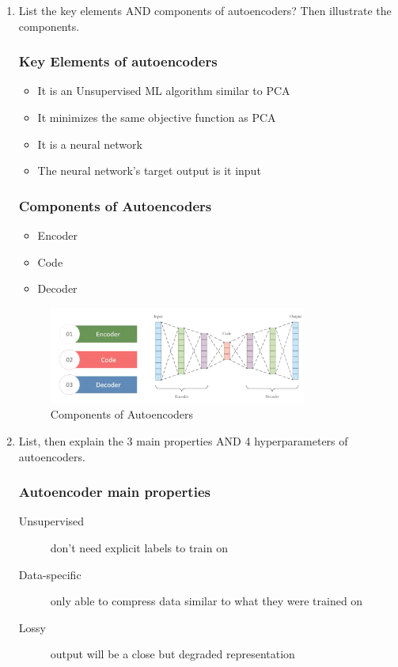 \documentclass[12pt]{article}
\newenvironment{QandA}{\begin{enumerate}[label=\bfseries\arabic*.]\bfseries}
{\end{enumerate}}
\newenvironment{answered}{\par\normalfont\color{Sepia}}{}
\begin{document}
\begin{QandA}
    \item List the key elements AND components of autoencoders? 
          Then illustrate the components.
    \begin{answered}
        \subsubsection*{Key Elements of autoencoders}
        \begin{itemize}
            \item It is an Unsupervised ML algorithm similar to PCA
            \item It minimizes the same objective function as PCA
            \item It is a neural network
            \item The neural network's target output is it input
        \end{itemize}
        \subsubsection*{Components of Autoencoders}
        \begin{itemize}
            \item Encoder
            \item Code
            \item Decoder
        \end{itemize}

        \begin{figure}[H]
            \centering
            \includegraphics[width=0.8\textwidth]{autoencoder.png}
            \caption{Components of Autoencoders}
            \label{fig:autoencoder}
        \end{figure}

    \end{answered}

    \item List, then explain the 3 main properties AND 4 hyperparameters of autoencoders.
    \begin{answered}
        \subsubsection*{Autoencoder main properties}
        \begin{description}
            \item[Unsupervised] don't need explicit labels to train on
            \item[Data-specific] only able to compress data similar to what they were trained on
            \item[Lossy] output will be a close but degraded representation
        \end{description}


\end{answered}
\end{QandA}
\end{document}
